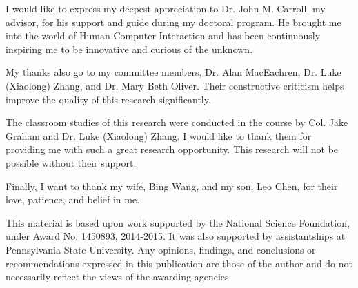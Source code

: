 
I would like to express my deepest appreciation to  Dr. John M. Carroll, my advisor, for his support and guide during my doctoral program. He brought me into the world of Human-Computer Interaction and has been continuously inspiring me to be innovative and curious of the unknown.

My thanks also go to my committee members, Dr. Alan MacEachren, Dr. Luke (Xiaolong) Zhang, and Dr. Mary Beth Oliver. Their constructive criticism helps improve the quality of this research significantly.

The classroom studies of this research were conducted in the course by Col. Jake Graham and Dr. Luke (Xiaolong) Zhang. I would like to thank them for providing me with such a great research opportunity. This research will not be possible without their support. 

Finally, I want to thank my wife, Bing Wang, and my son, Leo Chen, for their love, patience, and belief in me. 

This material is based upon work supported by the National Science Foundation, under Award No. 1450893, 2014-2015. It was also supported by assistantships at Pennsylvania State University. Any opinions, findings, and conclusions or recommendations
expressed in this publication are those of the author and do not necessarily reflect the views of the awarding agencies.